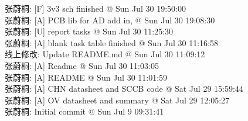 \documentclass[a4paper]{paper}
\begin{document}
张蔚桐: [F] 3v3 sch finished @ Sun Jul 30 19:50:00\\ 
张蔚桐: [A] PCB lib for AD add in, @ Sun Jul 30 19:08:30\\ 
张蔚桐: [U] report tasks @ Sun Jul 30 11:25:30\\ 
张蔚桐: [A] blank task table finished @ Sun Jul 30 11:16:58\\ 
线上修改: Update README.md @ Sun Jul 30 11:09:12\\ 
张蔚桐: [A] Readme @ Sun Jul 30 11:03:05\\ 
张蔚桐: [A] README @ Sun Jul 30 11:01:59\\ 
张蔚桐: [A] CHN datasheet and SCCB code @ Sat Jul 29 15:59:44\\ 
张蔚桐: [A] OV datasheet and summary @ Sat Jul 29 12:05:27\\ 
张蔚桐: Initial commit @ Sun Jul 9 09:31:41\\ 
\end{document}
